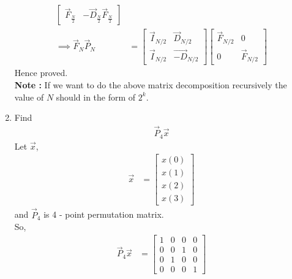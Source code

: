 \documentclass[journal,12pt,twocolumn]{IEEEtran}
\renewcommand\thesection{\arabic{section}}
\begin{document}
\begin{enumerate}[label=\arabic*.,ref=\thesection.\theenumi]
\begin{align}
\begin{bmatrix}
                   \vec{F}_{\frac{N}{2}}& -\vec{D}_{\frac{N}{2}}\vec{F}_{\frac{N}{2}}
                \end{bmatrix} \\
        \implies 	\vec{F}_{N}\vec{P}_{N} &= \begin{bmatrix}
                                                \vec{I}_{N/2} & \vec{D}_{N/2} \\
                                              \vec{I}_{N/2} & \vec{-D}_{N/2}
                                              \end{bmatrix}
                                             \begin{bmatrix}
                                            \vec{F}_{N/2} &  0 \\
                                                    0       & \vec{F}_{N/2}
                                             \end{bmatrix}
      \end{align}  
    Hence proved.\\
    \textbf{Note :} If we want to do the above matrix decomposition recursively the value of $N$ should in the form of $2^{k}$.
              \item Find 
        \begin{align}
           \vec{P}_4 \vec{x}
        \end{align}
    \solution Let $\vec{x}$,
           \begin{align}
             \vec{x} &= \begin{bmatrix}
                       x(0) \\ 
                        x(1) \\ 
                       x(2) \\ 
                       x(3)
                        \end{bmatrix}
           \end{align}
         and $\vec{P}_4$ is 4 - point permutation matrix.\\
        So,
        \begin{align}
          \vec{P}_{4}\vec{x} &= \begin{bmatrix}
                                   1 & 0 & 0 & 0 \\
                                   0 & 0 & 1 & 0 \\
                                   0 & 1 & 0 & 0 \\
                                   0 & 0 & 0 & 1   		
                                 \end{bmatrix}

\end{align}
\end{enumerate}
\end{document}
